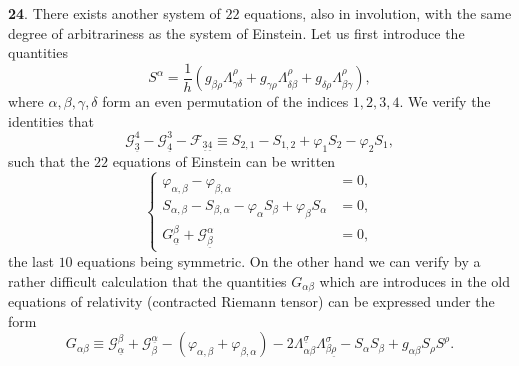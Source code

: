 \documentclass[leqno,11pt]{article}
\theoremstyle{shape1}
\theoremstyle{shape0}
\theoremstyle{shape2}
\theoremstyle{definition}
\begin{document}
\vspace{12pt}

\textbf{24}. There exists another system of $22$ equations, also in involution, with the same degree of arbitrariness as the system of Einstein. Let us first introduce the quantities
\[
S^{\alpha}=\frac{1}{h}(g_{\beta\rho}\Lambda^{\rho}_{\gamma\delta}+g_{\gamma\rho}\Lambda^{\rho}_{\delta\beta}+g_{\delta\rho}\Lambda^{\rho}_{\beta\gamma}),
\]
where $\alpha,\beta,\gamma,\delta$ form an even permutation of the indices $1,2,3,4$. We verify the identities that
\[
\mathcal{G}^{4}_{\underline 3}-\mathcal{G}^{3}_{\underline 4}-\mathcal{F}_{\underline 3\underline 4}\equiv S_{2,1}-S_{1,2}+\varphi_{1}S_{2}-\varphi_{2}S_{1},
\]
such that the $22$ equations of Einstein can be written
\begin{equation}
  \label{eq:VI'}\tag{IV$'$}
  \left\{
    \begin{aligned}
      \varphi_{\alpha,\beta}-\varphi_{\beta,\alpha}&=0,\\
      S_{\alpha,\beta}-S_{\beta,\alpha}-\varphi_{\alpha}S_{\beta}+\varphi_{\beta}S_{\alpha}&=0,\\
      {G}^{\beta}_{\underline\alpha}+\mathcal{G}^{\alpha}_{\underline\beta}&=0,
    \end{aligned}
  \right.
\end{equation}
the last $10$ equations being symmetric. On the other hand we can verify by a rather difficult calculation that the quantities $G_{\alpha\beta}$ which are introduces in the old equations of relativity (contracted Riemann tensor) can be expressed under the form
\[
G_{\alpha\beta}\equiv\mathcal{G}^{\beta}_{\underline\alpha}+\mathcal{G}^{\underline\alpha}_{\beta}-(\varphi_{\alpha,\beta}+\varphi_{\beta,\alpha})-2\Lambda^{\underline\sigma}_{\alpha\beta}\Lambda^{\sigma}_{\beta\underline\rho}-S_{\alpha}S_{\beta}+g_{\alpha\beta}S_{\rho}S^{\rho}.
\]
\end{document}
